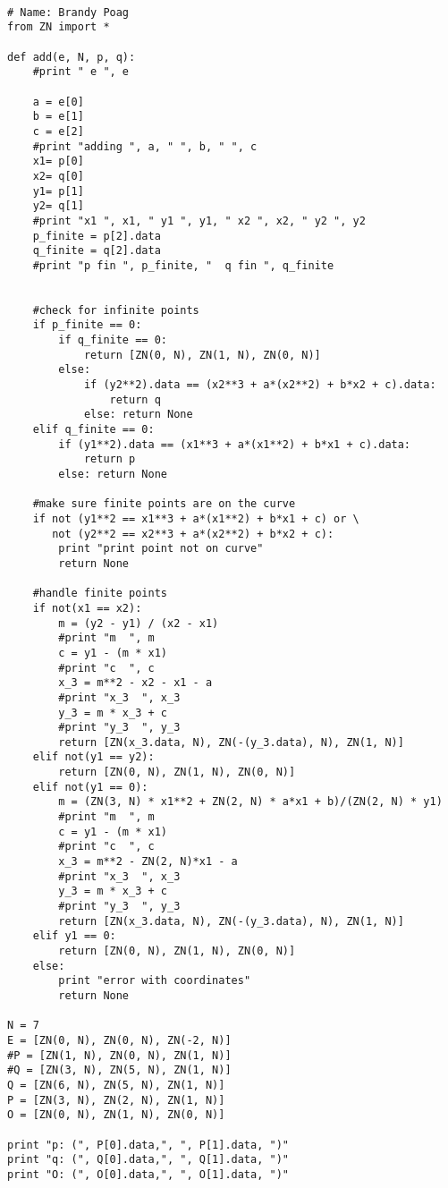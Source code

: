 \documentclass[a4paper,12pt]{article}
\begin{document}
\begin{Verbatim}[frame=single]

# Name: Brandy Poag
from ZN import *

def add(e, N, p, q):
    #print " e ", e
    
    a = e[0]
    b = e[1]
    c = e[2]
    #print "adding ", a, " ", b, " ", c
    x1= p[0]
    x2= q[0]
    y1= p[1]
    y2= q[1]
    #print "x1 ", x1, " y1 ", y1, " x2 ", x2, " y2 ", y2
    p_finite = p[2].data
    q_finite = q[2].data
    #print "p fin ", p_finite, "  q fin ", q_finite

    
    #check for infinite points
    if p_finite == 0:
        if q_finite == 0:
            return [ZN(0, N), ZN(1, N), ZN(0, N)]
        else:
            if (y2**2).data == (x2**3 + a*(x2**2) + b*x2 + c).data:
                return q
            else: return None
    elif q_finite == 0:
        if (y1**2).data == (x1**3 + a*(x1**2) + b*x1 + c).data:
            return p
        else: return None
        
    #make sure finite points are on the curve
    if not (y1**2 == x1**3 + a*(x1**2) + b*x1 + c) or \
       not (y2**2 == x2**3 + a*(x2**2) + b*x2 + c):
        print "print point not on curve"
        return None
    
    #handle finite points
    if not(x1 == x2):
        m = (y2 - y1) / (x2 - x1)
        #print "m  ", m
        c = y1 - (m * x1)
        #print "c  ", c
        x_3 = m**2 - x2 - x1 - a 
        #print "x_3  ", x_3
        y_3 = m * x_3 + c
        #print "y_3  ", y_3
        return [ZN(x_3.data, N), ZN(-(y_3.data), N), ZN(1, N)]
    elif not(y1 == y2):
        return [ZN(0, N), ZN(1, N), ZN(0, N)]
    elif not(y1 == 0):
        m = (ZN(3, N) * x1**2 + ZN(2, N) * a*x1 + b)/(ZN(2, N) * y1)
        #print "m  ", m
        c = y1 - (m * x1)
        #print "c  ", c
        x_3 = m**2 - ZN(2, N)*x1 - a 
        #print "x_3  ", x_3
        y_3 = m * x_3 + c
        #print "y_3  ", y_3
        return [ZN(x_3.data, N), ZN(-(y_3.data), N), ZN(1, N)]
    elif y1 == 0:
        return [ZN(0, N), ZN(1, N), ZN(0, N)]
    else:
        print "error with coordinates"
        return None

N = 7
E = [ZN(0, N), ZN(0, N), ZN(-2, N)]
#P = [ZN(1, N), ZN(0, N), ZN(1, N)]
#Q = [ZN(3, N), ZN(5, N), ZN(1, N)]
Q = [ZN(6, N), ZN(5, N), ZN(1, N)]
P = [ZN(3, N), ZN(2, N), ZN(1, N)]
O = [ZN(0, N), ZN(1, N), ZN(0, N)]

print "p: (", P[0].data,", ", P[1].data, ")"
print "q: (", Q[0].data,", ", Q[1].data, ")"
print "O: (", O[0].data,", ", O[1].data, ")"


\end{Verbatim}
\end{document}
